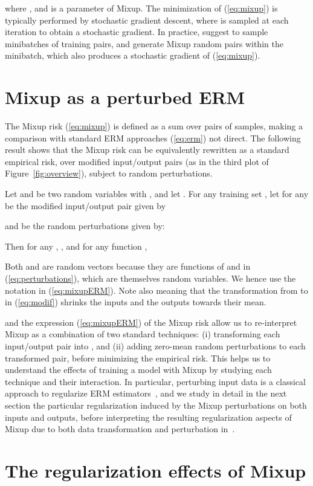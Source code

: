 \documentclass[twoside,11pt]{article}
\begin{document}
where , and  is a parameter of Mixup. The minimization of (\ref{eq:mixup}) is typically performed by stochastic gradient descent, where  is sampled at each iteration to obtain a stochastic gradient. In practice, \citet{Zhang2018mixup} suggest to sample minibatches of training pairs, and generate Mixup random pairs within the minibatch, which also produces a stochastic gradient of (\ref{eq:mixup}). \section{Mixup as a perturbed ERM}\label{sec:erm}

The Mixup risk (\ref{eq:mixup}) is defined as a sum over pairs of samples, making a comparison with standard ERM approaches (\ref{eq:erm}) not direct. The following result shows that the Mixup risk can be equivalently rewritten as a standard empirical risk, over modified input/output pairs (as in the third plot of Figure~\ref{fig:overview}), subject to random perturbations.

\begin{theorem}\label{thm:mixupAsErm}
Let  and  
be two random variables with ,  and let . For any training set , let  for any  be the modified input/output pair given by

and  be the random perturbations given by:

Then for any , , and for any function ,

\end{theorem}
Both  and  are random vectors because they are functions of  and  in (\ref{eq:perturbations}), which are themselves random variables. We hence use the notation  in (\ref{eq:mixupERM}). Note also  meaning that the transformation from  to  in (\ref{eq:modif}) shrinks the inputs and the outputs towards their mean.

and the expression (\ref{eq:mixupERM}) of the Mixup risk allow us to re-interpret Mixup as a combination of two standard techniques: (i) transforming each input/output pair  into , and (ii) adding zero-mean random perturbations  to each transformed pair, before minimizing the empirical risk. 
This helps us to understand the effects of training a model with Mixup by studying each technique and their interaction.
In particular, perturbing input data is a classical approach to regularize ERM estimators~\citep{bishop1995training,srivastava2014dropout,wager2013dropout,wei2020implicit}, and we study in detail in the next section the particular regularization induced by the Mixup perturbations on both inputs and outputs, before interpreting the resulting regularization aspects of Mixup due to both data transformation and perturbation in~. \section{The regularization effects of Mixup}\label{sec:regu}
\end{document}
